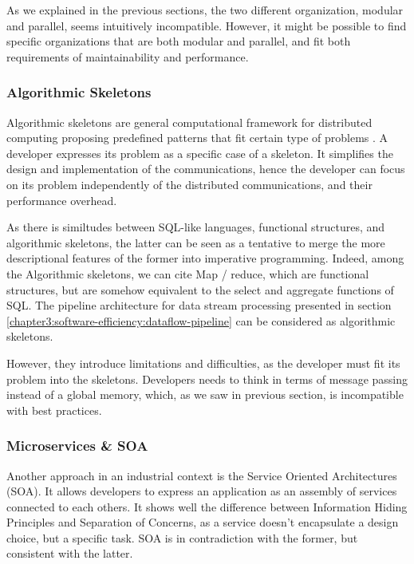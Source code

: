 As we explained in the previous sections, the two different organization, modular and parallel, seems intuitively incompatible.
However, it might be possible to find specific organizations that are both modular and parallel, and fit both requirements of maintainability and performance.

\subsubsection{Algorithmic Skeletons}

Algorithmic skeletons are general computational framework for distributed computing proposing predefined patterns that fit certain type of problems \cite{Cole1988, Dean2008, McCool2010, Gonzalez-Velez2010}.
A developer expresses its problem as a specific case of a skeleton.
It simplifies the design and implementation of the communications, hence the developer can focus on its problem independently of the distributed communications, and their performance overhead.

As there is similtudes between SQL-like languages, functional structures, and algorithmic skeletons, the latter can be seen as a tentative to merge the more descriptional features of the former into imperative programming.
Indeed, among the Algorithmic skeletons, we can cite Map / reduce, which are functional structures, but are somehow equivalent to the select and aggregate functions of SQL.
The pipeline architecture for data stream processing presented in section \ref{chapter3:software-efficiency:dataflow-pipeline} can be considered as algorithmic skeletons.

However, they introduce limitations and difficulties, as the developer must fit its problem into the skeletons.
Developers needs to think in terms of message passing instead of a global memory, which, as we saw in previous section, is incompatible with best practices.

\subsubsection{Microservices \& SOA}

Another approach in an industrial context is the Service Oriented Architectures (SOA).
It allows developers to express an application as an assembly of services connected to each others.
It shows well the difference between Information Hiding Principles and Separation of Concerns, as a service doesn't encapsulate a design choice, but a specific task.
SOA is in contradiction with the former, but consistent with the latter.

